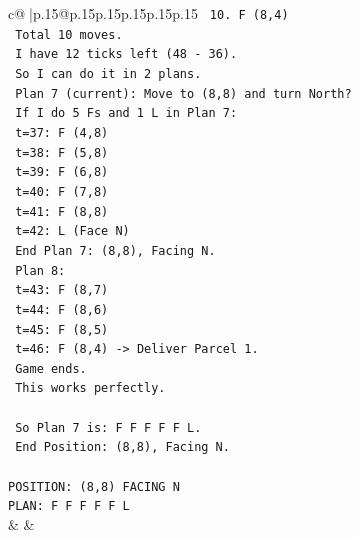 \documentclass{article}
\begin{document}
{\begin{supertabular}{c@{$\;$}|p{.15\linewidth}@{}p{.15\linewidth}p{.15\linewidth}p{.15\linewidth}p{.15\linewidth}p{.15\linewidth}}
{{{\texttt{   10. F (8,4)} \\
\texttt{   Total 10 moves.} \\
\texttt{   I have 12 ticks left (48 {-} 36).} \\
\texttt{   So I can do it in 2 plans.} \\
\texttt{   Plan 7 (current): Move to (8,8) and turn North?} \\
\texttt{   If I do 5 Fs and 1 L in Plan 7:} \\
\texttt{   t=37: F (4,8)} \\
\texttt{   t=38: F (5,8)} \\
\texttt{   t=39: F (6,8)} \\
\texttt{   t=40: F (7,8)} \\
\texttt{   t=41: F (8,8)} \\
\texttt{   t=42: L (Face N)} \\
\texttt{   End Plan 7: (8,8), Facing N.} \\
\texttt{   Plan 8:} \\
\texttt{   t=43: F (8,7)} \\
\texttt{   t=44: F (8,6)} \\
\texttt{   t=45: F (8,5)} \\
\texttt{   t=46: F (8,4) {-}> Deliver Parcel 1.} \\
\texttt{   Game ends.} \\
\texttt{   This works perfectly.} \\
\\ 
\texttt{   So Plan 7 is: F F F F F L.} \\
\texttt{   End Position: (8,8), Facing N.} \\
\\ 
\texttt{POSITION: (8,8) FACING N} \\
\texttt{PLAN: F F F F F L} \\
            }
        }
    }
    & & \\ \\


\end{supertabular}}
\end{document}
